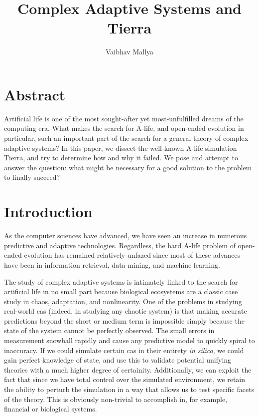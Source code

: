 \documentclass[11pt, twocolumn]{article}
\begin{document}
\title{Complex Adaptive Systems and Tierra}
\author{Vaibhav Mallya}
\maketitle

\section{Abstract}

Artificial life is one of the most sought-after yet most-unfulfilled dreams of the computing era.
What makes the search for A-life, and open-ended evolution in particular, such an important part of the search for a general theory of complex adaptive systems?
In this paper, we dissect the well-known A-life simulation Tierra, and try to determine how and why it failed. We pose and attempt to answer the question: what might be necessary for a good solution to the problem to finally succeed?

\section{Introduction}

As the computer sciences have advanced, we have seen an increase in numerous predictive and adaptive technologies. Regardless, the hard A-life problem of open-ended evolution has remained relatively unfazed since most of these advances have been in information retrieval, data mining, and machine learning.

The study of complex adaptive systems is intimately linked to the search for artificial life in no small part because biological ecosystems are a classic case study in chaos, adaptation, and nonlinearity. One of the problems in studying real-world cas (indeed, in studying any chaotic system) is that making accurate predictions beyond the short or medium term is impossible simply because the state of the system cannot be perfectly observed. The small errors in measurement snowball rapidly and cause any predictive model to quickly spiral to inaccuracy. If we could simulate certain cas in their entirety \emph{in silico}, we could gain perfect knowledge of state, and use this to validate potential unifying theories with a much higher degree of certainity. Additionally, we can exploit the fact that since we have total control over the simulated environment, we retain the ability to perturb the simulation in a way that allows us to test specific facets of the theory. This is obviously non-trivial to accomplish in, for example, financial \cite{RecipeForDisaster} or biological systems.
\end{document}

